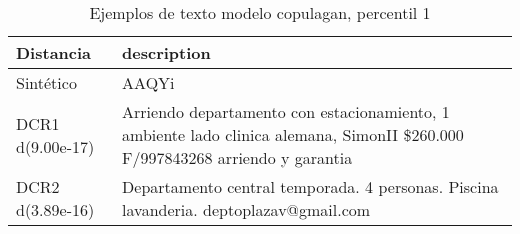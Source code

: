 \begin{table}[H]
\centering
\fontsize{10}{14}\selectfont
\caption{Ejemplos de texto modelo copulagan, percentil 1}
\label{table-example-economicos-b-3-copulagan-1p-text}
\begin{tabular}{|l|m{35em}|}
\hline
\rowcolor[gray]{0.8}
Distancia & description \\
\hline Sintético & AAQYi \\
\hline DCR1 d(9.00e-17) & Arriendo departamento con estacionamiento, 1 ambiente lado clinica alemana, SimonII \$260.000 F/997843268 arriendo y garantia \\
\hline DCR2 d(3.89e-16) & Departamento central temporada. 4 personas. Piscina lavanderia.  deptoplazav@gmail.com \\
\hline
\end{tabular}
\end{table}
